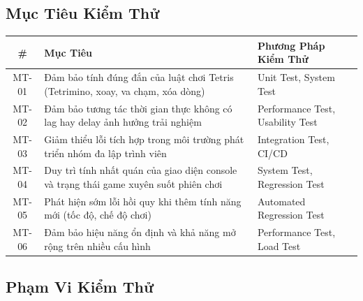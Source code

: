 \documentclass[12pt,a4paper]{article}
\begin{document}
\subsection{Mục Tiêu Kiểm Thử}


\begin{table}[H]
\centering
{}
\begin{tabularx}{\linewidth}{|c|X|X|}
\hline
\rowcolor{gray!35}
\textbf{\#} & \textbf{Mục Tiêu} & \textbf{Phương Pháp Kiểm Thử} \\ \hline
MT-01 & Đảm bảo tính đúng đắn của luật chơi Tetris (Tetrimino, xoay, va chạm, xóa dòng) & Unit Test, System Test \\ \hline
MT-02 & Đảm bảo tương tác thời gian thực không có lag hay delay ảnh hưởng trải nghiệm & Performance Test, Usability Test \\ \hline
MT-03 & Giảm thiểu lỗi tích hợp trong môi trường phát triển nhóm đa lập trình viên & Integration Test, CI/CD \\ \hline
MT-04 & Duy trì tính nhất quán của giao diện console và trạng thái game xuyên suốt phiên chơi & System Test, Regression Test \\ \hline
MT-05 & Phát hiện sớm lỗi hồi quy khi thêm tính năng mới (tốc độ, chế độ chơi) & Automated Regression Test \\ \hline
MT-06 & Đảm bảo hiệu năng ổn định và khả năng mở rộng trên nhiều cấu hình & Performance Test, Load Test \\ \hline
\end{tabularx}
\end{table}

\subsection{Phạm Vi Kiểm Thử}
\end{document}

